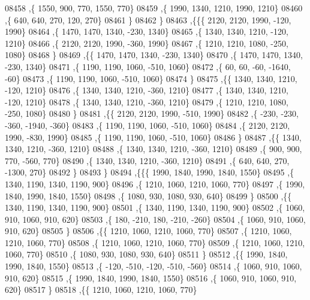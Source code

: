 \begin{DoxyCode}
08458     ,\{  1550,   900,   770,  1550,   770\}
08459     ,\{  1990,  1340,  1210,  1990,  1210\}
08460     ,\{   640,   640,   270,   120,   270\}
08461     \}
08462    \}
08463   ,\{\{\{  2120,  2120,  1990,  -120,  1990\}
08464     ,\{  1470,  1470,  1340,  -230,  1340\}
08465     ,\{  1340,  1340,  1210,  -120,  1210\}
08466     ,\{  2120,  2120,  1990,  -360,  1990\}
08467     ,\{  1210,  1210,  1080,  -250,  1080\}
08468     \}
08469    ,\{\{  1470,  1470,  1340,  -230,  1340\}
08470     ,\{  1470,  1470,  1340,  -230,  1340\}
08471     ,\{  1190,  1190,  1060,  -510,  1060\}
08472     ,\{    60,    60,   -60, -1640,   -60\}
08473     ,\{  1190,  1190,  1060,  -510,  1060\}
08474     \}
08475    ,\{\{  1340,  1340,  1210,  -120,  1210\}
08476     ,\{  1340,  1340,  1210,  -360,  1210\}
08477     ,\{  1340,  1340,  1210,  -120,  1210\}
08478     ,\{  1340,  1340,  1210,  -360,  1210\}
08479     ,\{  1210,  1210,  1080,  -250,  1080\}
08480     \}
08481    ,\{\{  2120,  2120,  1990,  -510,  1990\}
08482     ,\{  -230,  -230,  -360, -1940,  -360\}
08483     ,\{  1190,  1190,  1060,  -510,  1060\}
08484     ,\{  2120,  2120,  1990,  -830,  1990\}
08485     ,\{  1190,  1190,  1060,  -510,  1060\}
08486     \}
08487    ,\{\{  1340,  1340,  1210,  -360,  1210\}
08488     ,\{  1340,  1340,  1210,  -360,  1210\}
08489     ,\{   900,   900,   770,  -560,   770\}
08490     ,\{  1340,  1340,  1210,  -360,  1210\}
08491     ,\{   640,   640,   270, -1300,   270\}
08492     \}
08493    \}
08494   ,\{\{\{  1990,  1840,  1990,  1840,  1550\}
08495     ,\{  1340,  1190,  1340,  1190,   900\}
08496     ,\{  1210,  1060,  1210,  1060,   770\}
08497     ,\{  1990,  1840,  1990,  1840,  1550\}
08498     ,\{  1080,   930,  1080,   930,   640\}
08499     \}
08500    ,\{\{  1340,  1190,  1340,  1190,   900\}
08501     ,\{  1340,  1190,  1340,  1190,   900\}
08502     ,\{  1060,   910,  1060,   910,   620\}
08503     ,\{   180,  -210,   180,  -210,  -260\}
08504     ,\{  1060,   910,  1060,   910,   620\}
08505     \}
08506    ,\{\{  1210,  1060,  1210,  1060,   770\}
08507     ,\{  1210,  1060,  1210,  1060,   770\}
08508     ,\{  1210,  1060,  1210,  1060,   770\}
08509     ,\{  1210,  1060,  1210,  1060,   770\}
08510     ,\{  1080,   930,  1080,   930,   640\}
08511     \}
08512    ,\{\{  1990,  1840,  1990,  1840,  1550\}
08513     ,\{  -120,  -510,  -120,  -510,  -560\}
08514     ,\{  1060,   910,  1060,   910,   620\}
08515     ,\{  1990,  1840,  1990,  1840,  1550\}
08516     ,\{  1060,   910,  1060,   910,   620\}
08517     \}
08518    ,\{\{  1210,  1060,  1210,  1060,   770\}

\end{DoxyCode}
